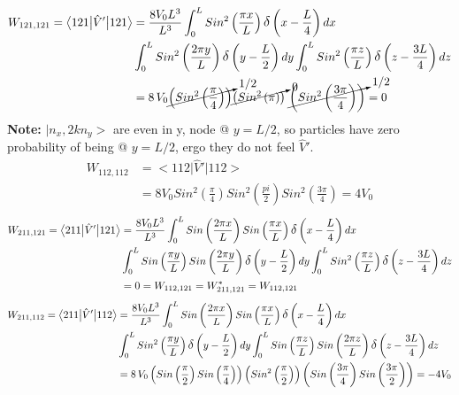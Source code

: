 \documentclass[12pt,fancychapters]{report}
\numberwithin{equation}{section}
\begin{document}
\begin{align*}
  W_{121,121} =\big<121\big|\hat{V}'\big|121 \big> &=  \frac{8V_0L^3}{L^3}\int_{0}^{L}
  Sin^2\left(\frac{\pi x}{L}\right)\mathlarger{\delta}\left(x-\frac{L}{4}\right)dx\\
  &\int_{0}^{L}
  Sin^2\left(\frac{2\pi y}{L}\right)\mathlarger{\delta}\left(y-\frac{L}{2}\right)dy
  \int_{0}^{L}
  Sin^2\left(\frac{\pi z}{L}\right)\mathlarger{\delta}\left(z-\frac{3L}{4}\right)dz\\
  &= 8\,V_0\cancelto{1/2}{\left(Sin^2\left(\frac{\pi}{4}\right)\right)}
  \cancelto{0}{\left(Sin^2\left(\pi\right)\right)}\,\,
  \cancelto{1/2}{\left(Sin^2\left(\frac{3\pi}{4}\right)\right)} = 0
\end{align*}
\textbf{Note:} $\big|n_x,2kn_y\big>$ are even in y, node @ $y=L/2$, so particles have zero 
probability of being @ $y=L/2$, ergo they do not feel $\hat{V}'$.
\begin{align*}
  W_{112,112} &=\big<112\big|\hat{V}'\big|112 \big> \\
&= 8V_0 Sin^2\left(\frac{\pi}{4}\right)Sin^2\left(\frac{pi}{2}\right) 
Sin^2\left(\frac{3\pi}{4}\right) = 4V_0
\end{align*}
\begin{align*}
 W_{211,121} =\big<211\big|\hat{V}'\big|121 \big> &=   \frac{8V_0L^3}{L^3}\int_{0}^{L}
 Sin\left(\frac{2\pi x}{L}\right)Sin\left(\frac{\pi x}{L}\right)
 \mathlarger{\delta}\left(x-\frac{L}{4}\right)dx\\
  &\int_{0}^{L}
  Sin\left(\frac{\pi y}{L}\right)Sin\left(\frac{2\pi y}{L}\right)
  \mathlarger{\delta}\left(y-\frac{L}{2}\right)dy
  \int_{0}^{L}
  Sin^2\left(\frac{\pi z}{L}\right)\mathlarger{\delta}\left(z-\frac{3L}{4}\right)dz\\
  &= 0 = W_{112,121} = W^*_{211,121} = W_{112,121}
\end{align*}
\begin{align*}
  W_{211,112} =\big<211\big|\hat{V}'\big|112 \big> &=  \frac{8V_0L^3}{L^3}\int_{0}^{L}
  Sin\left(\frac{2\pi x}{L}\right)Sin\left(\frac{\pi x}{L}\right)
  \mathlarger{\delta}\left(x-\frac{L}{4}\right)dx\\
  &\int_{0}^{L}
  Sin^2\left(\frac{\pi y}{L}\right)\mathlarger{\delta}\left(y-\frac{L}{2}\right)dy
  \int_{0}^{L}
  Sin\left(\frac{\pi z}{L}\right)Sin\left(\frac{2\pi z}{L}\right)
  \mathlarger{\delta}\left(z-\frac{3L}{4}\right)dz\\
  &= 8\,V_0 \left(Sin\left(\frac{\pi}{2}\right)Sin\left(\frac{\pi}{4}\right)\right)
  \left(Sin^2\left(\frac{\pi}{2}\right)\right)
  \left(Sin\left(\frac{3\pi}{4}\right)Sin\left(\frac{3\pi}{2}\right)\right) = -4V_0
\end{align*}
\end{document}
